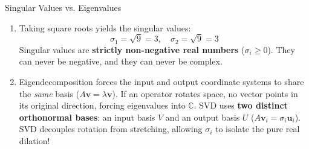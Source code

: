 \begin{ponderbox}{Singular Values vs. Eigenvalues}
\begin{enumerate}
    The eigenvalues of $A^T A$ are $\lambda_1 = 9$ and $\lambda_2 = 9$.
    \item Taking square roots yields the singular values:
    \begin{equation*}
    \sigma_1 = \sqrt{9} = 3, \quad \sigma_2 = \sqrt{9} = 3
    \end{equation*}
    Singular values are \textbf{strictly non-negative real numbers} ($\sigma_i \ge 0$). They can never be negative, and they can never be complex.
    \item Eigendecomposition forces the input and output coordinate systems to share the \emph{same} basis ($A\mathbf{v} = \lambda \mathbf{v}$). If an operator rotates space, no vector points in its original direction, forcing eigenvalues into $\mathbb{C}$. SVD uses \textbf{two distinct orthonormal bases}: an input basis $V$ and an output basis $U$ ($A\mathbf{v}_i = \sigma_i \mathbf{u}_i$). SVD decouples rotation from stretching, allowing $\sigma_i$ to isolate the pure real dilation!
\end{enumerate}
\end{ponderbox}

